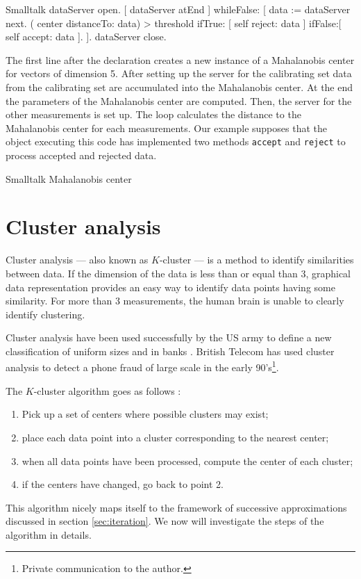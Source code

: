 
\begin{listing}{Smalltalk}
  { }
  dataServer open.
 [ dataServer atEnd ]
      whileFalse: [ data := dataServer next.
                    ( center distanceTo: data) > threshold
                        ifTrue: [ self reject: data ]
                        ifFalse:[ self accept: data ].
                  ].
 dataServer close.
\end{listing}

The first line after the declaration creates a new instance of a
Mahalanobis center for vectors of dimension 5. After setting up
the server for the calibrating set data from the calibrating set
are accumulated into the Mahalanobis center. At the end the
parameters of the Mahalanobis center are computed. Then, the
server for the other measurements is set up. The loop calculates
the distance to the Mahalanobis center for each measurements. Our
example supposes that the object executing this code has
implemented two methods \texttt{accept} and \texttt{reject} to process
accepted and rejected data.

\begin{listing} Smalltalk Mahalanobis center  \label{ls:mahalanobis}

\end{listing}

\section{Cluster analysis}
\label{sec:cluster} Cluster analysis --- also known as $K$-cluster
--- is a method to identify similarities between data. If the
dimension of the data is less than or equal than 3, graphical data
representation provides an easy way to identify data points having
some similarity. For more than 3 measurements, the human brain is
unable to clearly identify clustering.

Cluster analysis have been used successfully by the US army to
define a new classification of uniform sizes and in banks
\cite{BerLin}. British Telecom has used cluster analysis to detect
a phone fraud of large scale in the early 90's\footnote{Private
communication to the author.}.

\noindent The $K$-cluster algorithm goes as follows \cite{BerLin}:
\begin{enumerate}
  \item Pick up a set of centers where possible clusters may
  exist;
  \item place each data point into a cluster corresponding to the
  nearest center;
  \item when all data points have been processed, compute the
  center of each cluster;
  \item if the centers have changed, go back to point 2.
\end{enumerate}
This algorithm nicely maps itself to the framework of successive
approximations discussed in section \ref{sec:iteration}. We now
will investigate the steps of the algorithm in details.

